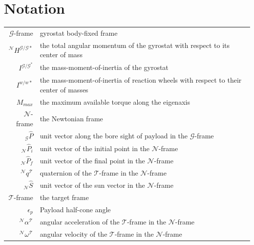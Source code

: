 \documentclass[letterpaper, preprint, paper,11pt]{AAS}	%
\begin{document}
	\section{Notation}
\begin{tabular}{r l}
$\mathcal{G}$-frame& gyrostat body-fixed frame\\
$^\mathcal{N}H^{\mathcal{G/G*}}$& the total angular momentum of the gyrostat with respect to its center of mass\\
$I^{\mathcal{G/G^*}}$ &the mass-moment-of-inertia of the gyrostat\\
$I^{w/w*}$ & the mass-moment-of-inertia of reaction wheels with respect to their center of masses\\
$M_{max}$ & the maximum available torque along the eigenaxis\\
$\mathcal{N}$-frame & the Newtonian frame \\


$_\mathcal{G}\hat{P}$ & unit vector along the bore sight of payload in the $\mathcal{G}$-frame\\
$_\mathcal{N}\hat{P}_i$ & unit vector of the initial point in the $\mathcal{N}$-frame\\
$_\mathcal{N}\hat{P}_f$ & unit vector of the final point in the $\mathcal{N}$-frame\\

$^\mathcal{N}q^\mathcal{T}$& quaternion of the $\mathcal{T}$-frame in the $\mathcal{N}$-frame\\
$_\mathcal{N}\hat{S}$ & unit vector of the sun vector in the $\mathcal{N}$-frame\\
$\mathcal{T}$-frame & the target frame \\
$\epsilon_p$ & Payload half-cone angle\\
$^\mathcal{N}\alpha^\mathcal{T}$& angular acceleration of the $\mathcal{T}$-frame in the $\mathcal{N}$-frame\\
$^\mathcal{N}\omega^\mathcal{T}$& angular velocity of the $\mathcal{T}$-frame in the $\mathcal{N}$-frame\\

\end{tabular} \\

	
	
	
	
\end{document}
